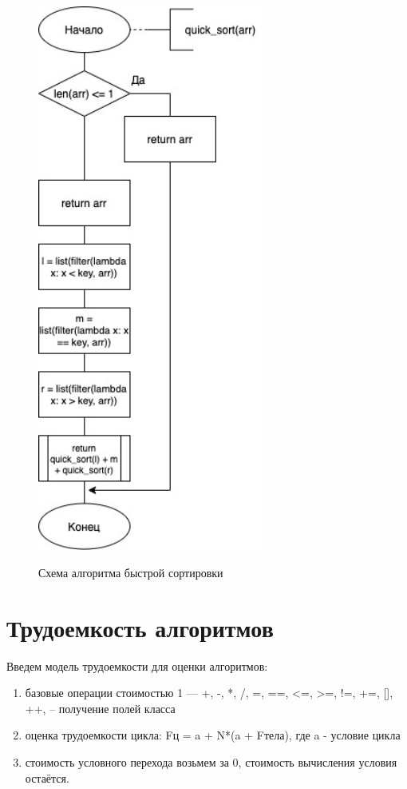 \documentclass[12pt]{report}
\begin{document}
\begin{figure}
	\begin{center}
	{\includegraphics[height = 18cm]{quick.jpg}}
	\caption{Схема алгоритма быстрой сортировки}
	\label{ris:imageQuick}
	\end{center}
\end{figure}


\newpage
\section{Трудоемкость алгоритмов}
Введем модель трудоемкости для оценки алгоритмов:
\begin{enumerate}
  	\item  базовые операции стоимостью 1 — +, -, *, /, =, ==, <=, >=, !=, +=, [], ++, -- получение полей класса
	\item оценка трудоемкости цикла: Fц = a + N*(a + Fтела), где a - условие цикла
	\item стоимость условного перехода возьмем за 0, стоимость вычисления условия остаётся.
\end{enumerate}
\end{document}

